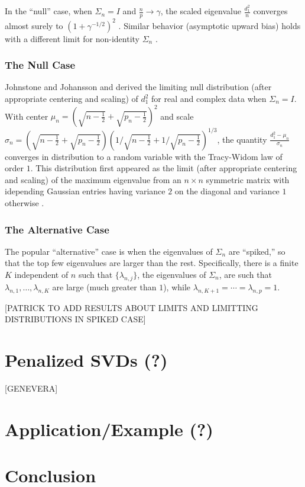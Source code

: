 \documentclass{eoeauth}
\begin{document}
In the ``null'' case, when $\Sigma_n = I$ and $\tfrac{n}{p} \to \gamma$,
the scaled eigenvalue $\frac{d_1^2}{n}$ converges almost surely to
$(1 + \gamma^{-1/2})^2$ \cite{geman1980ltn,jonsson1983ole}.  Similar
behavior (asymptotic upward bias) holds with a different limit for
non-identity $\Sigma_n$
\cite{silverstein1984ole,yin1988lle,bai1988nle}. 

\subsubsection{The Null Case}

Johnstone \cite{johnstone2001dle} and Johansson \cite{johansson2000sfa}
and derived the limiting null distribution (after appropriate
centering and scaling) of $d_1^2$ for real and complex data when
$\Sigma_n = I$.  With center
$\mu_n = \left(\sqrt{n-\tfrac{1}{2}} + \sqrt{p_n - \tfrac{1}{2}}\right)^2$ and scale
$\sigma_n = \left(\sqrt{n-\tfrac{1}{2}} + \sqrt{p_n -
    \tfrac{1}{2}}\right) \left(1/\sqrt{n-\tfrac{1}{2}} + 1/\sqrt{p_n -
    \tfrac{1}{2}}\right)^{1/3}$, 
the quantity
\(
\frac{d^2_1 - \mu_n}{\sigma_n}
\)
converges in distribution to a random variable with the Tracy-Widom
law of order $1$.  This distribution first appeared as the limit
(after appropriate centering and scaling) of the maximum eigenvalue
from an $n \times n$ symmetric matrix with idepending Gaussian entries
having variance $2$ on the diagonal and variance $1$ otherwise
\cite{tracy1994lsd, tracy1996oas}.

\subsubsection{The Alternative Case}
 The popular ``alternative'' case is when the eigenvalues of $\Sigma_n$ are
``spiked,'' so that the top few eigenvalues are larger than the rest.
Specifically, there is a finite $K$ independent of $n$ such that $\{ \lambda_{n,j} \}$,
the eigenvalues of $\Sigma_n$, are such that $\lambda_{n,1}, \dotsc,
\lambda_{n,K}$ are large (much greater than $1$), while $\lambda_{n,K+1} = \cdots =
\lambda_{n,p} = 1$.

[PATRICK TO ADD RESULTS ABOUT LIMITS AND LIMITTING DISTRIBUTIONS IN
SPIKED CASE]



\section{Penalized SVDs (?)}
[GENEVERA]

\section{Application/Example (?)}

\section{Conclusion}



\end{document}
